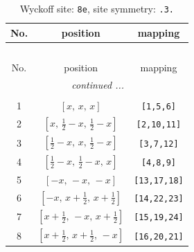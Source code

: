 \documentclass[fleqn,8pt]{jsarticle}
\begin{document}
\renewcommand{\arraystretch}{1.2}
\begin{longtable}{ccc}
\caption{Wyckoff site: {\tt 8e}, site symmetry: {\tt .3.}}
 \\
 \hline \hline
No. & position & mapping \\ \hline \endfirsthead

\multicolumn{2}{l}{\tablename\ \thetable{}} \\
 \hline \hline
No. & position & mapping \\ \hline \endhead

 \hline \hline
\multicolumn{2}{r}{\footnotesize\it continued ...} \\ \endfoot

 \hline \hline
\multicolumn{2}{r}{} \\ \endlastfoot

1 & $\left[ x,\, x,\, x \right]$ & {\tt [1,5,6]} \\ \hline
2 & $\left[ x,\, \frac{1}{2} - x,\, \frac{1}{2} - x \right]$ & {\tt [2,10,11]} \\ \hline
3 & $\left[ \frac{1}{2} - x,\, x,\, \frac{1}{2} - x \right]$ & {\tt [3,7,12]} \\ \hline
4 & $\left[ \frac{1}{2} - x,\, \frac{1}{2} - x,\, x \right]$ & {\tt [4,8,9]} \\ \hline
5 & $\left[ - x,\, - x,\, - x \right]$ & {\tt [13,17,18]} \\ \hline
6 & $\left[ - x,\, x + \frac{1}{2},\, x + \frac{1}{2} \right]$ & {\tt [14,22,23]} \\ \hline
7 & $\left[ x + \frac{1}{2},\, - x,\, x + \frac{1}{2} \right]$ & {\tt [15,19,24]} \\ \hline
8 & $\left[ x + \frac{1}{2},\, x + \frac{1}{2},\, - x \right]$ & {\tt [16,20,21]} \\
\end{longtable}
\renewcommand{\arraystretch}{1.2}
\end{document}
